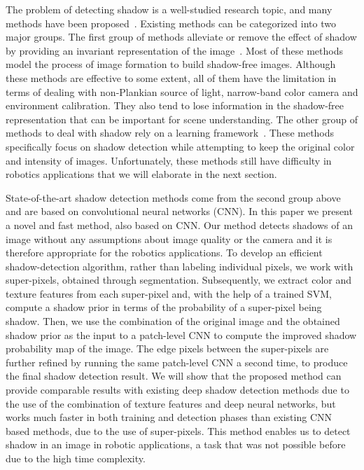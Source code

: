 \documentclass[letterpaper, 10 pt, conference]{ieeeconf}
\begin{document}
The problem of detecting shadow is a well-studied research topic, and many methods have been proposed~\cite{Corke, Maddern, Finlayson, Jiang, Shakeri, Barrow, Zhu, Khan, Khan2, Vincente_rev}. Existing methods can be categorized into two major groups. The first group of methods alleviate or remove the effect of shadow by providing an invariant representation of the image~\cite{Corke,Maddern,Finlayson,Finlayson2,Shakeri, Barrow}. Most of these methods model the process of image formation to build shadow-free images. Although these methods are effective to some extent, all of them have the limitation in terms of dealing with non-Plankian source of light, narrow-band color camera and environment calibration. They also tend to lose information in the shadow-free representation that can be important for scene understanding. The other group of methods to deal with shadow rely on a learning framework~\cite{Gue,Vicente,Zhu, Khan, Khan2, Vincente_rev}. These methods specifically focus on shadow detection while attempting to keep the original color and intensity of images. Unfortunately, these methods still have difficulty in robotics applications that we will elaborate in the next section. 

State-of-the-art shadow detection methods come from the second group above and are based on convolutional neural networks (CNN). In this paper we present a novel and fast method, also based on CNN. Our method detects shadows of an image without any assumptions about image quality or the camera and it is therefore  appropriate for the robotics applications. To develop an efficient shadow-detection algorithm, rather than labeling individual pixels, we work with super-pixels, obtained through segmentation. Subsequently, we extract color and texture features from each super-pixel and, with the help of a trained SVM, compute a shadow prior in terms of the probability of a super-pixel being shadow. Then, we use the combination of the original image and the obtained shadow prior as the input to a patch-level CNN to compute the improved shadow probability map of the image. The edge pixels between the super-pixels are further refined by running the same patch-level CNN a second time, to produce the final shadow detection result. We will show that the proposed method can provide comparable results with existing deep shadow detection methods due to the use of the combination of texture features and deep neural networks, but works much faster in both training and detection phases than existing CNN based methods, due to the use of super-pixels. This method enables us to detect shadow in an image in robotic applications, a task that was not possible before due to the high time complexity.
\end{document}
